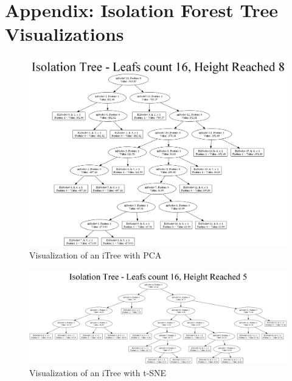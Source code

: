
\newpage
\onecolumn


\section{Appendix: Isolation Forest Tree Visualizations}


\begin{figure}[htbp]
\centering
\includegraphics[width=1\textwidth]{resources/images/itree_pca_graph.png}
\caption{Visualization of an iTree with PCA}
\label{fig:pca_itree_appendix}
\end{figure}

\begin{figure}[htbp]
\centering
\includegraphics[width=1\textwidth]{resources/images/itree_tsne_graph.png}
\caption{Visualization of an iTree with t-SNE}
\label{fig:tsne_itree_appendix}
\end{figure}